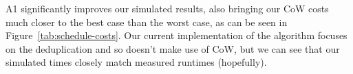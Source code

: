 A1 significantly improves our simulated results, also bringing our CoW costs
much closer to the best case than the worst case, as can be seen in
Figure~\ref{tab:schedule-costs}.  Our current implementation of the algorithm
focuses on the deduplication and so doesn't make use of CoW, but we can see
that our simulated times closely match measured runtimes (hopefully). 
